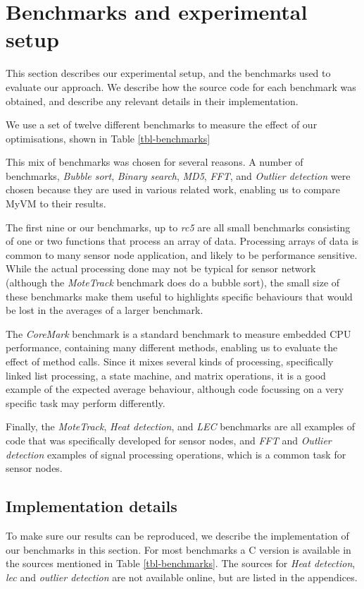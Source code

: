 \section{Benchmarks and experimental setup}
\label{sec-evaluation-benchmarks}
This section describes our experimental setup, and the benchmarks used to evaluate our approach. We describe how the source code for each benchmark was obtained, and describe any relevant details in their implementation.

We use a set of twelve different benchmarks to measure the effect of our optimisations, shown in Table \ref{tbl-benchmarks}



This mix of benchmarks was chosen for several reasons. A number of benchmarks, \emph{Bubble sort}, \emph{Binary search}, \emph{MD5}, \emph{FFT}, and \emph{Outlier detection} were chosen because they are used in various related work, enabling us to compare MyVM to their results.

The first nine or our benchmarks, up to \emph{rc5} are all small benchmarks consisting of one or two functions that process an array of data. Processing arrays of data is common to many sensor node application, and likely to be performance sensitive. While the actual processing done may not be typical for sensor network (although the \emph{MoteTrack} benchmark does do a bubble sort), the small size of these benchmarks make them useful to highlights specific behaviours that would be lost in the averages of a larger benchmark.

The \emph{CoreMark} benchmark is a standard benchmark to measure embedded CPU performance, containing many different methods, enabling us to evaluate the effect of method calls. Since it mixes several kinds of processing, specifically linked list processing, a state machine, and matrix operations, it is a good example of the expected average behaviour, although code focussing on a very specific task may perform differently.

Finally, the \emph{MoteTrack}, \emph{Heat detection}, and \emph{LEC} benchmarks are all examples of code that was specifically developed for sensor nodes, and \emph{FFT} and \emph{Outlier detection} examples of signal processing operations, which is a common task for sensor nodes.


\subsection{Implementation details}
To make sure our results can be reproduced, we describe the implementation of our benchmarks in this section. For most benchmarks a C version is available in the sources mentioned in Table \ref{tbl-benchmarks}. The sources for \emph{Heat detection}, \emph{lec} and \emph{outlier detection} are not available online, but are listed in the appendices.

